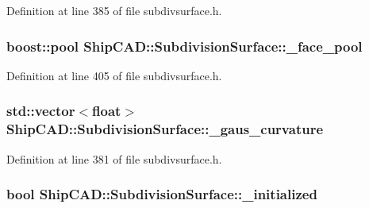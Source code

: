 Definition at line 385 of file subdivsurface.\-h.

\hypertarget{classShipCAD_1_1SubdivisionSurface_a2f746c1c19594b1baa03e9c49c9ffd0a}{
\subsubsection[{\-\_\-face\-\_\-pool}]{\setlength{\rightskip}{0pt plus 5cm}boost\-::pool Ship\-C\-A\-D\-::\-Subdivision\-Surface\-::\-\_\-face\-\_\-pool\hspace{0.3cm}{\ttfamily [protected]}}}\label{classShipCAD_1_1SubdivisionSurface_a2f746c1c19594b1baa03e9c49c9ffd0a}


Definition at line 405 of file subdivsurface.\-h.

\hypertarget{classShipCAD_1_1SubdivisionSurface_a20cbcc689f7b2f8af21f502748521185}{
\subsubsection[{\-\_\-gaus\-\_\-curvature}]{\setlength{\rightskip}{0pt plus 5cm}std\-::vector$<$float$>$ Ship\-C\-A\-D\-::\-Subdivision\-Surface\-::\-\_\-gaus\-\_\-curvature\hspace{0.3cm}{\ttfamily [protected]}}}\label{classShipCAD_1_1SubdivisionSurface_a20cbcc689f7b2f8af21f502748521185}


Definition at line 381 of file subdivsurface.\-h.

\hypertarget{classShipCAD_1_1SubdivisionSurface_a828f85ee49e1481e95f61b919070842c}{
\subsubsection[{\-\_\-initialized}]{\setlength{\rightskip}{0pt plus 5cm}bool Ship\-C\-A\-D\-::\-Subdivision\-Surface\-::\-\_\-initialized\hspace{0.3cm}{\ttfamily [protected]}}}\label{classShipCAD_1_1SubdivisionSurface_a828f85ee49e1481e95f61b919070842c}


